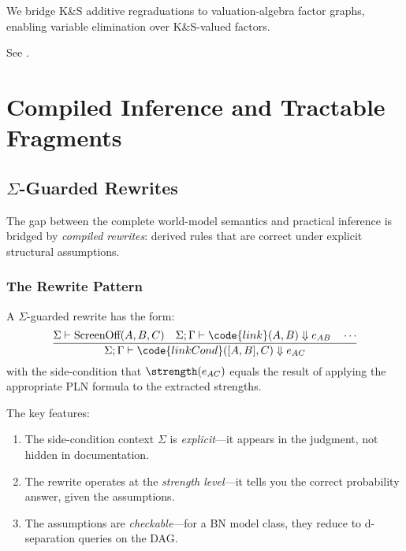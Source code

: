 \documentclass[11pt,openany]{report}
\begin{document}
We bridge K\&S additive regraduations to valuation-algebra factor graphs,
enabling variable elimination over K\&S-valued factors.

See .


\part{Compiled Inference and Tractable Fragments}
\label{part:compiled}

\chapter{\texorpdfstring{$\Sigma$}{Sigma}-Guarded Rewrites}
\label{ch:sigma-rewrites}

The gap between the complete world-model semantics and practical inference
is bridged by \emph{compiled rewrites}: derived rules that are correct
under explicit structural assumptions.

\section{The Rewrite Pattern}

A $\Sigma$-guarded rewrite has the form:
\[
\frac{\Sigma \vdash \text{ScreenOff}(A, B, C) \quad
      \Sigma; \Gamma \vdash \code{link}(A, B) \Downarrow e_{AB} \quad
      \cdots}
     {\Sigma; \Gamma \vdash \code{linkCond}([A, B], C) \Downarrow e_{AC}}
\]
with the side-condition that $\strength(e_{AC})$ equals the result of
applying the appropriate PLN formula to the extracted strengths.

The key features:
\begin{enumerate}
\item The side-condition context $\Sigma$ is \emph{explicit}---it appears
  in the judgment, not hidden in documentation.
\item The rewrite operates at the \emph{strength level}---it tells you
  the correct probability answer, given the assumptions.
\item The assumptions are \emph{checkable}---for a BN model class, they
  reduce to d-separation queries on the DAG.
\end{enumerate}
\end{document}
